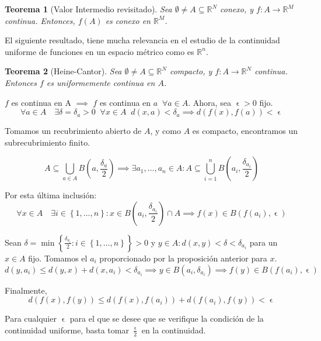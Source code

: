 \documentclass[11pt, a4paper, titlepage]{article}
\makeatletter
\let\epsilon\upvarepsilon
\renewenvironment{proof}[1][\proofname] {\vspace{-15pt}\par\pushQED{\qed}\normalfont\topsep6\p@\@plus6\p@\relax\trivlist\item[\hskip\labelsep\it#1\@addpunct{.}]\ignorespaces}{\popQED\endtrivlist\@endpefalse}
\newcommand\ddfrac[2]{\frac{\displaystyle #1}{\displaystyle #2}}
\newcommand{\R}{\mathbb{R}}
\theoremstyle{theorem-style}
\newtheorem*{nth}{Teorema}
\theoremstyle{definition-style}
\theoremstyle{remark-style}
\theoremstyle{example-style}
\makeatother
\begin{document}
\begin{nth}[Valor Intermedio revisitado]
Sea $\emptyset \ne A\subseteq \mathbb{R}^N$ conexo, y $f:A \longrightarrow \mathbb{R}^M$ continua. Entonces, $f(A)$ es conexo en $\mathbb{R}^M$.
\end{nth}

El siguiente resultado, tiene mucha relevancia en el estudio de la continuidad uniforme de funciones en un espacio métrico como es $\R^n$.
\begin{nth}[Heine-Cantor]
	Sea $\emptyset\ne A \subseteq \mathbb{R}^N$ compacto, y $f : A \longrightarrow \mathbb{R}^N$ continua. Entonces $f$ es uniformemente continua en $A$.
\end{nth}


\begin{proof}
	$f$ es continua en A $\implies$ $f$ es continua en $a\;\; \forall a \in A$. Ahora, sea $\epsilon>0$ fijo.
	\[
	    \forall a \in A \quad \exists \delta = \delta_a > 0\;\; \forall x\in A\;\; d(x,a) < \delta_a \implies d(f(x),f(a))<\epsilon
	\]

	Tomamos un recubrimiento abierto de $A$, y como $A$ es compacto, encontramos un subrecubrimiento finito.
	
	\[
		A \subseteq \bigcup_{a\in A} B(a, \frac{\delta_a}{2}) \implies \exists a_1,\dots,a_n \in A: A \subseteq \bigcup_{i=1}^n B\left(a_i, \frac{\delta_{a_i}}{2}\right)
	\]
	
	Por esta última inclusión:
	\[
		\forall x\in A\quad \exists i \in \left \{ 1,\dots,n \right \} : x\in B\left(a_i,\frac{\delta_{a_i}}{2}\right)\cap A \implies f(x)\in B(f(a_i),\epsilon)
	\]
	
	Sean $\delta = \min\left\{\ddfrac{\delta_{a_i}}{2} : i \in \left \{ 1,\dots,n \right \}\right\} > 0$ y $y\in A : d(x,y) < \delta < \delta_{a_i}$ para un $x\in A$ fijo. Tomamos el $a_i$ proporcionado por la proposición anterior para $x$.
	\[
		d(y,a_i) \le d(y,x)+d(x,a_i) < \delta_{a_i} \implies y\in B(a_i,\delta_{a_i}) \implies f(y) \in B(f(a_i), \epsilon)
	\]
	
	Finalmente,
	\[
		d(f(x), f(y)) \le d(f(x),f(a_i)) + d(f(a_i), f(y)) < \epsilon
	\]
	
	Para cualquier $\epsilon$ para el que se desee que se verifique la condición de la continuidad uniforme, basta tomar $\ddfrac{\epsilon}{2}$ en la continuidad.
\end{proof}
\end{document}
